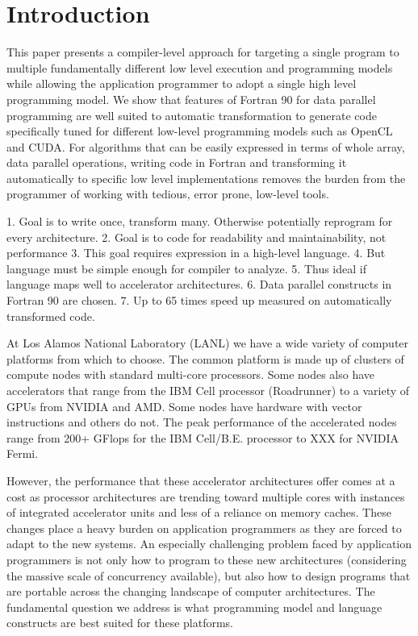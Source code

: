 \section{Introduction}

This paper presents a compiler-level approach for targeting a single
program to multiple fundamentally different low level execution and
programming models while allowing the application programmer to adopt
a single high level programming model.  We show that features of
Fortran 90 for data parallel programming are well suited to automatic
transformation to generate code specifically tuned for different
low-level programming models such as OpenCL and CUDA.  For algorithms
that can be easily expressed in terms of whole array, data parallel operations,
writing code in Fortran and transforming it automatically to specific low
level implementations removes the burden from the programmer of working
with tedious, error prone, low-level tools.

1. Goal is to write once, transform many. Otherwise potentially reprogram for every architecture.
2. Goal is to code for readability and maintainability, not performance
3. This goal requires expression in a high-level language.
4. But language must be simple enough for compiler to analyze.
5. Thus ideal if language maps well to accelerator architectures.
6. Data parallel constructs in Fortran 90 are chosen.
7. Up to 65 times speed up measured on automatically transformed code.

At Los Alamos National Laboratory (LANL) we have a wide variety of computer
platforms from which to choose.  The common platform is made up of clusters of
compute nodes with standard multi-core processors.  Some nodes also have
accelerators that range from the IBM Cell processor (Roadrunner) to a variety
of GPUs from NVIDIA and AMD.  Some nodes have hardware with vector
instructions and others do not. The peak
performance of the accelerated nodes range from 200+ GFlops for the IBM Cell/B.E.
processor to XXX for NVIDIA Fermi. %

However, the performance that these accelerator architectures offer comes at a
cost as processor architectures are trending toward multiple cores with
instances of integrated accelerator units and less of a reliance on memory
caches.  These changes place a heavy burden on application programmers as they
are forced to adapt to the new systems.  An especially challenging problem
faced by application programmers is not only how to program to these new
architectures (considering the massive scale of concurrency available), but
also how to design programs that are portable across the changing landscape of
computer architectures.  The fundamental question we address is what
programming model and language constructs are best suited for these platforms.

